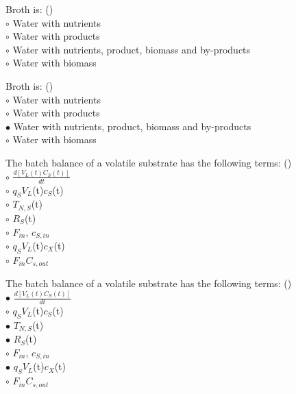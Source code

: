 \documentclass[]{beamer}
\begin{document}
\begin{frame}[shrink] {}
\addtocounter{questions}{1}
\color{blue}
Broth is: ()\\
\color{black}
\setlength{\parindent}{-0.4cm}
{\color{red}$\circ$}  Water with nutrients \\
{\color{red}$\circ$} Water with products \\
{\color{red}$\circ$}  Water with nutrients, product, biomass and by-products \\
{\color{red}$\circ$} Water with biomass  \\
\end{frame}
\begin{frame}[shrink] {}
\addtocounter{answers}{1}
\color{blue}
Broth is: ()\\
\color{black}
\setlength{\parindent}{-0.4cm}
{\color{red}$\circ$}  Water with nutrients \\
{\color{red}$\circ$} Water with products \\
{\color{red}$\bullet$}  Water with nutrients, product, biomass and by-products \\
{\color{red}$\circ$} Water with biomass  \\
\end{frame}

\begin{frame}[shrink] {}
\color{blue}

The batch balance of a volatile substrate has the following terms: ({\color{green}{Q6}})\\[0.5em]
\color{black}
\setlength{\parindent}{-0.4cm}
{\color{red}$\circ$} $\frac{d[V_L(t)C_S(t)]}{dt}$  \\
{\color{red}$\circ$} $q_{S}$$V_{L}$(t)$c_{S}$(t)  \\
{\color{red}$\circ$} $T_{N,S}$(t)  \\
{\color{red}$\circ$} $R_{S}$(t)  \\
{\color{red}$\circ$} $F_{in}$, $c_{S,in}$  \\
{\color{red}$\circ$} $q_{S}$$V_{L}$(t)$c_{X}$(t)  \\
{\color{red}$\circ$} $F_{in}$$C_{s,out}$  \\
\end{frame}
\begin{frame}[shrink] {}
\color{blue}

The batch balance of a volatile substrate has the following terms: ({\color{green}{Q6}})\\[0.5em]
\color{black}
\setlength{\parindent}{-0.4cm}
{\color{red}$\bullet$} $\frac{d[V_L(t)C_S(t)]}{dt}$  \\
{\color{red}$\circ$} $q_{S}$$V_{L}$(t)$c_{S}$(t)  \\
{\color{red}$\bullet$} $T_{N,S}$(t)  \\
{\color{red}$\bullet$} $R_{S}$(t)  \\
{\color{red}$\circ$} $F_{in}$, $c_{S,in}$  \\
{\color{red}$\bullet$} $q_{S}$$V_{L}$(t)$c_{X}$(t)  \\
{\color{red}$\circ$} $F_{in}$$C_{s,out}$  \\
\end{frame}
\end{document}

